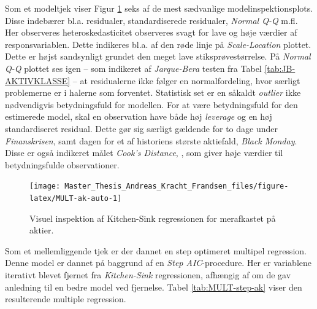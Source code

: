 \documentclass[
  a4paper,
  oneside]{memoir}
\begin{document}
Som et modeltjek viser Figur \ref{fig:MULT-ak-auto} seks af de mest sædvanlige modelinspektionsplots. Disse indebærer bl.a. residualer, standardiserede residualer, \emph{Normal Q-Q} m.fl. Her observeres heteroskedasticitet observeres svagt for lave og høje værdier af responsvariablen. Dette indikeres bl.a. af den røde linje på \emph{Scale-Location} plottet. Dette er højst sandsynligt grundet den meget lave stiksprøvestørrelse. På \emph{Normal Q-Q} plottet ses igen -- som indikeret af \emph{Jarque-Bera} testen fra Tabel \ref{tab:JB-AKTIVKLASSE} -- at residualerne ikke følger en normalfordeling, hvor særligt problemerne er i halerne som forventet. Statistisk set er en såkaldt \emph{outlier} ikke nødvendigvis betydningsfuld for modellen. For at være betydningsfuld for den estimerede model, skal en observation have både høj \emph{leverage} og en høj standardiseret residual. Dette gør sig særligt gældende for to dage under \emph{Finanskrisen}, samt dagen for et af historiens største aktiefald, \emph{Black Monday}. Disse er også indikeret målet \emph{Cook's Distance}, \citep{Cook1977}, som giver høje værdier til betydningsfulde observationer.

\begin{figure}[H]

{\centering \texttt{[image: Master\_Thesis\_Andreas\_Kracht\_Frandsen\_files/figure-latex/MULT-ak-auto-1]} 

}

\caption{Visuel inspektion af Kitchen-Sink regressionen for merafkastet på aktier.}\label{fig:MULT-ak-auto}
\end{figure}

Som et mellemliggende tjek er der dannet en step optimeret multipel regression. Denne model er dannet på baggrund af en \emph{Step AIC}-procedure. Her er variablene iterativt blevet fjernet fra \emph{Kitchen-Sink} regressionen, afhængig af om de gav anledning til en bedre model ved fjernelse. Tabel \ref{tab:MULT-step-ak} viser den resulterende multiple regression.
\end{document}
